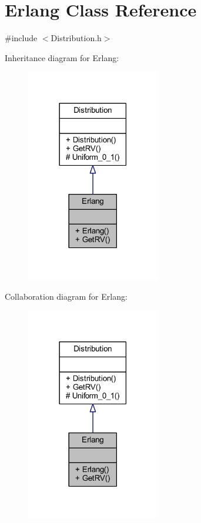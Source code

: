\hypertarget{class_erlang}{}\section{Erlang Class Reference}
\label{class_erlang}


{\ttfamily \#include $<$Distribution.\+h$>$}



Inheritance diagram for Erlang\+:\nopagebreak
\begin{figure}[H]
\begin{center}
\leavevmode
\includegraphics[width=165pt]{class_erlang__inherit__graph}
\end{center}
\end{figure}


Collaboration diagram for Erlang\+:\nopagebreak
\begin{figure}[H]
\begin{center}
\leavevmode
\includegraphics[width=165pt]{class_erlang__coll__graph}
\end{center}
\end{figure}

